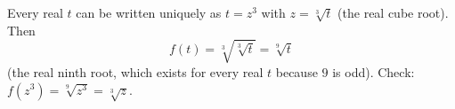 Every real $t$ can be written uniquely as $t=z^3$ with $z=\sqrt[3]t$ (the real cube root). Then
\[
f(t)=\sqrt[3]{\sqrt[3]t}=\boxed{\sqrt[9]{t}}
\]
(the real ninth root, which exists for every real $t$ because $9$ is odd). Check: $f\left(z^3\right)=\sqrt[9]{z^3}=\sqrt[3]z$.
